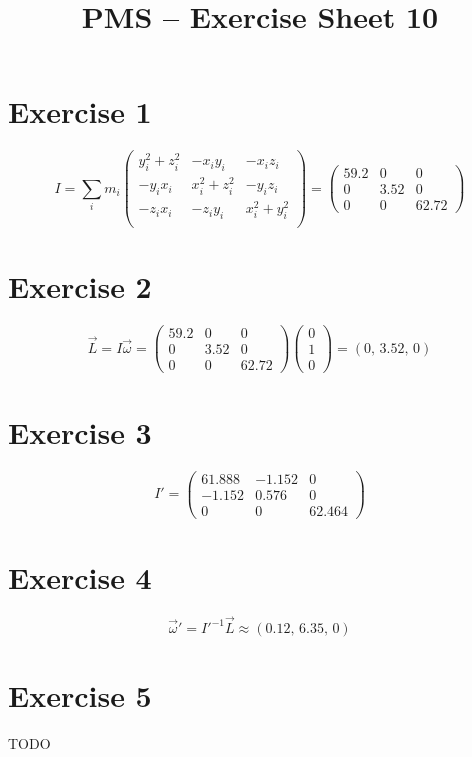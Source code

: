 \documentclass[10pt,DIV10,a4paper]{scrartcl}
\title{PMS -- Exercise Sheet 10}
\date{}
\begin{document}
\maketitle

\section*{Exercise 1}

$$I = \sum_{i} m_{i}
\begin{pmatrix}
    y_i^2+z_i^2 & -x_i y_i    & -x_i z_i \\
   -y_i x_i     & x_i^2+z_i^2 & -y_i z_i \\
   -z_i x_i     & - z_i y_i     &  x_i^2+y_i^2 \\
\end{pmatrix} = \left(\begin{array}{rrr}
59.2& 0 & 0 \\
0 & 3.52 & 0 \\
0 & 0 & 62.72
\end{array}\right)$$

\section*{Exercise 2}

$$\vec{L} = I\vec{\omega} = \left(\begin{array}{rrr}
59.2& 0 & 0 \\
0 & 3.52 & 0 \\
0 & 0 & 62.72
\end{array}\right)
\left(\begin{array}{r}
0\\
1\\
0
\end{array}\right) = \left(0,\,3.52,\,0\right)
$$

\section*{Exercise 3}

$$I' = \left(\begin{array}{rrr}
61.888 & -1.152 & 0 \\
-1.152 & 0.576 & 0 \\
0 & 0 & 62.464
\end{array}\right)$$

\section*{Exercise 4}

$$\vec{\omega}' = I'^{-1}\vec{L} \approx \left(0.12,\,6.35,\,0\right)$$

\section*{Exercise 5}

TODO
\end{document}
